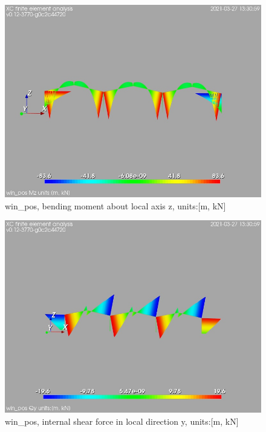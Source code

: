 \begin{figure}
\begin{center}
\includegraphics[width=\linewidth]{calc_results/sole_zeinali/text/graphics/resSimplLC/win_posallMemberSetMz}
\caption{win_pos, bending moment about local axis z, units:[m, kN]}
\end{center}
\end{figure}
\begin{figure}
\begin{center}
\includegraphics[width=\linewidth]{calc_results/sole_zeinali/text/graphics/resSimplLC/win_posallMemberSetQy}
\caption{win_pos, internal shear force in local direction y, units:[m, kN]}
\end{center}
\end{figure}
